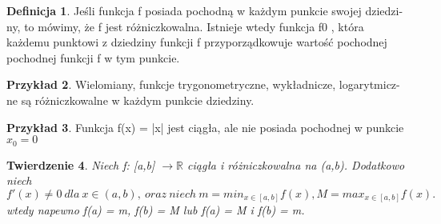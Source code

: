 \documentclass[12pt,a4paper]{article}
\newtheorem{tw}{Twierdzenie}[section]
\theoremstyle{definition}
\newtheorem{df}[tw]{Definicja}
\newtheorem{ex}[tw]{Przykład}
\begin{document}
\begin{df}
Jeśli funkcja f posiada pochodną w każdym punkcie swojej dziedzi-
ny, to mówimy, że f jest różniczkowalna. Istnieje wtedy funkcja f0
, która każdemu
punktowi z dziedziny funkcji f przyporządkowuje wartość pochodnej pochodnej
funkcji f w tym punkcie.
\end {df}

\begin{ex}
Wielomiany, funkcje trygonometryczne, wykładnicze, logarytmicz-
ne są różniczkowalne w każdym punkcie dziedziny.
\end{ex} 

\begin{ex}
Funkcja f(x) = |x| jest ciągła, ale nie posiada pochodnej w punkcie 
$x_{0} = 0 $
\end{ex}

\begin{tw}
Niech f: [a,b] $ \rightarrow \mathbb{R} $ ciągła i różniczkowalna na (a,b). Dodatkowo
niech $ f \prime (x) \neq 0 \ dla \ x \in (a,b), \ oraz \ niech \ m = min_{x \in [a,b]} f(x), M = max_{x \in [a,b]} f(x). $ \\
wtedy napewno f(a) = m, f(b) = M lub f(a) = M i f(b) = m.
\end{tw}
\end{document}
